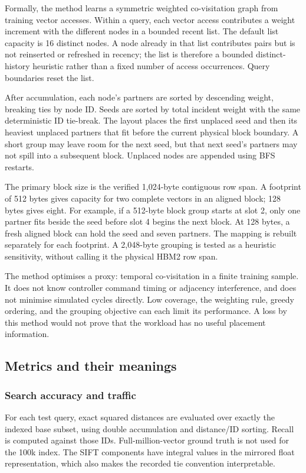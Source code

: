 \documentclass[11pt,a4paper]{report}
\begin{document}
Formally, the method learns a symmetric weighted co-visitation graph from training vector accesses. Within a query, each vector access contributes a weight increment with the different nodes in a bounded recent list. The default list capacity is 16 distinct nodes. A node already in that list contributes pairs but is not reinserted or refreshed in recency; the list is therefore a bounded distinct-history heuristic rather than a fixed number of access occurrences. Query boundaries reset the list.

After accumulation, each node's partners are sorted by descending weight, breaking ties by node ID. Seeds are sorted by total incident weight with the same deterministic ID tie-break. The layout places the first unplaced seed and then its heaviest unplaced partners that fit before the current physical block boundary. A short group may leave room for the next seed, but that next seed's partners may not spill into a subsequent block. Unplaced nodes are appended using BFS restarts.

The primary block size is the verified 1,024-byte contiguous row span. A footprint of 512 bytes gives capacity for two complete vectors in an aligned block; 128 bytes gives eight. For example, if a 512-byte block group starts at slot 2, only one partner fits beside the seed before slot 4 begins the next block. At 128 bytes, a fresh aligned block can hold the seed and seven partners. The mapping is rebuilt separately for each footprint. A 2,048-byte grouping is tested as a heuristic sensitivity, without calling it the physical HBM2 row span.

The method optimises a proxy: temporal co-visitation in a finite training sample. It does not know controller command timing or adjacency interference, and does not minimise simulated cycles directly. Low coverage, the weighting rule, greedy ordering, and the grouping objective can each limit its performance. A loss by this method would not prove that the workload has no useful placement information.



\subsection{Metrics and their meanings}
\subsubsection{Search accuracy and traffic}
For each test query, exact squared distances are evaluated over exactly the indexed base subset, using double accumulation and distance/ID sorting. Recall is computed against those IDs. Full-million-vector ground truth is not used for the 100k index. The SIFT components have integral values in the mirrored float representation, which also makes the recorded tie convention interpretable.
\end{document}

